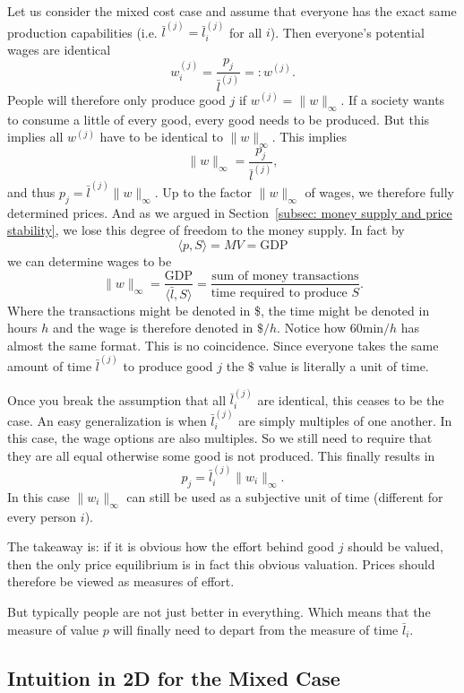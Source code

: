 Let us consider the mixed cost case and assume that everyone has the exact same
production capabilities (i.e. \(\bar{l}^{(j)} = \bar{l}_i^{(j)}\) for all
\(i\)). Then everyone's potential wages are identical
\[
	w_i^{(j)} = \frac{p_j}{\bar{l}^{(j)}} =: w^{(j)}.
\]
People will therefore only produce good \(j\) if \(w^{(j)} = \| w\|_\infty\).
If a society wants to consume a little of every good, every good needs to be
produced. But this implies all \(w^{(j)}\) have to be identical to
\(\|w\|_\infty\). This implies
\[
	\|w\|_\infty = \frac{p_j}{\bar{l}^{(j)}},
\]
and thus \(p_j = \bar{l}^{(j)}\|w\|_\infty\). Up to the factor \(\|w\|_\infty\)
of wages, we therefore fully determined prices. And as we argued in
Section~\ref{subsec: money supply and price stability}, we lose this degree of
freedom to the money supply. In fact by
\[
	\langle p, S\rangle = MV = \text{GDP}
\]
we can determine wages to be
\[
	\|w\|_\infty = \frac{\text{GDP}}{\langle \bar{l}, S\rangle}
	= \frac{\text{sum of money transactions}}{\text{time required to produce }S}.
\]
Where the transactions might be denoted in \$, the time might be denoted in
hours \(h\) and the wage is therefore denoted in \(\$/h\). Notice how
\(60 \text{min}/h\) has almost the same format. This is no coincidence. Since
everyone takes the same amount of time \(\bar{l}^{(j)}\) to produce good \(j\)
the \(\$\) value is literally a unit of time.

Once you break the assumption that all \(\bar{l}_i^{(j)}\) are identical, this
ceases to be the case. An easy generalization is when \(\bar{l}_i^{(j)}\) are
simply multiples of one another. In this case, the wage options are also
multiples. So we still need to require that they are all equal otherwise some 
good is not produced. This finally results in
\[
	p_j = \bar{l}_i^{(j)}\|w_i\|_\infty.
\]
In this case \(\|w_i\|_\infty\) can still be used as a subjective unit of time
(different for every person \(i\)).

The takeaway is: if it is obvious how the effort behind good \(j\) should be
valued, then the only price equilibrium is in fact this obvious valuation.
Prices should therefore be viewed as measures of effort.

But typically people are not just better in everything. Which means that the
measure of value \(p\) will finally need to depart from the measure of time
\(\bar{l}_i\).

\subsection{Intuition in 2D for the Mixed Case}

